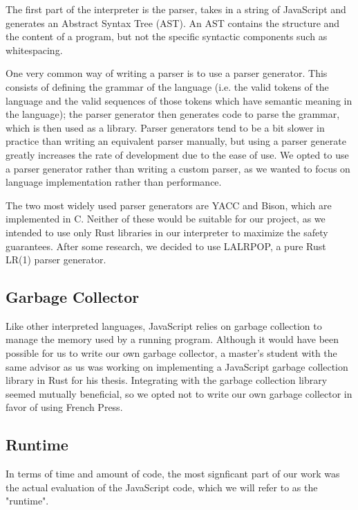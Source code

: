 \documentclass{article}
\begin{document}
\begin{multicols}{2}
The first part of the interpreter is the parser,
takes in a string of JavaScript and generates an Abstract Syntax Tree (AST).
An AST contains the structure and the content of a program, but not the specific
syntactic components such as whitespacing. \newline

One very common way of writing a parser is to use a parser
generator. This consists of defining
the grammar of the language (i.e. the valid tokens of the language and the valid
sequences of those tokens which have semantic meaning in the language);
the parser generator then generates code to parse
the grammar, which is then used as a library. Parser generators tend to
be a bit slower in practice than writing an equivalent parser manually, but using
a parser generate greatly increases the rate of development due to the ease of
use. We opted to use a
parser generator rather than writing a custom parser, as we wanted to focus on
language implementation rather than performance. \newline

The two most widely used parser generators are YACC and Bison, which are
implemented in C. Neither of these would be suitable for our project, as we
intended to use only Rust libraries in our interpreter to maximize the safety
guarantees. After some research, we decided to use LALRPOP, a pure Rust LR(1)
parser generator\cite{lalrpop}.

\subsection{Garbage Collector}

Like other interpreted languages, JavaScript relies on garbage collection to
manage the memory used by a running program. Although it would have been
possible for us to write our own garbage collector, a master's student
with the same advisor as us was working on implementing a JavaScript garbage
collection library in Rust for his thesis. Integrating with the garbage
collection library seemed mutually beneficial, so we opted not to write our own
garbage collector in favor of using French Press.

\subsection{Runtime}

In terms of time and amount of code, the most signficant part of our work was
the actual evaluation of the JavaScript code, which we will refer to as the
"runtime".

\end{multicols}
\end{document}
